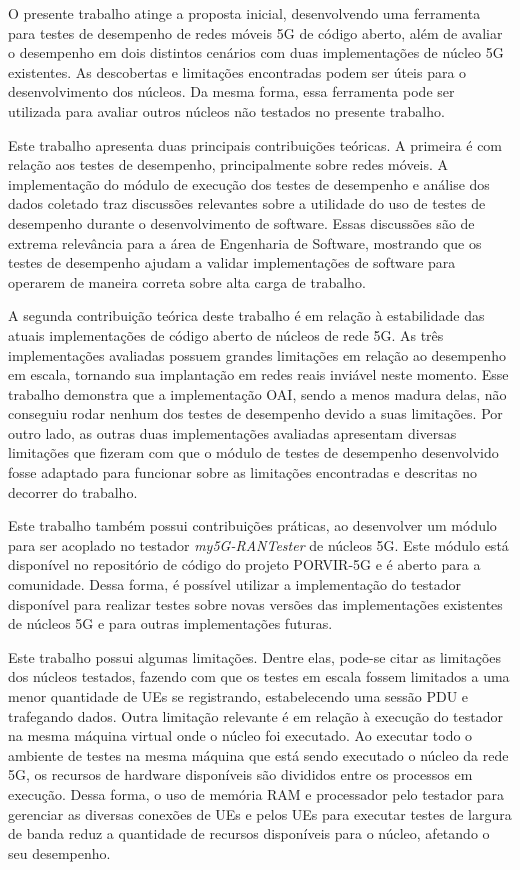 O presente trabalho atinge a proposta inicial, desenvolvendo uma ferramenta para testes de desempenho de redes móveis 5G de código aberto, além de avaliar o desempenho em dois distintos cenários com duas implementações de núcleo 5G existentes.
As descobertas e limitações encontradas podem ser úteis para o desenvolvimento dos núcleos. Da mesma forma, essa ferramenta pode ser utilizada para avaliar outros núcleos não testados no presente trabalho.

Este trabalho apresenta duas principais contribuições teóricas. A primeira é com relação aos testes de desempenho, principalmente sobre redes móveis.
A implementação do módulo de execução dos testes de desempenho e análise dos dados coletado traz discussões relevantes sobre a utilidade do uso de testes de desempenho durante o desenvolvimento de software.
Essas discussões são de extrema relevância para a área de Engenharia de Software, mostrando que os testes de desempenho ajudam a validar implementações de software para operarem de maneira correta sobre alta carga de trabalho.

A segunda contribuição teórica deste trabalho é em relação à estabilidade das atuais implementações de código aberto de núcleos de rede 5G.
As três implementações avaliadas possuem grandes limitações em relação ao desempenho em escala, tornando sua implantação em redes reais inviável neste momento.
Esse trabalho demonstra que a implementação OAI, sendo a menos madura delas, não conseguiu rodar nenhum dos testes de desempenho devido a suas limitações.
Por outro lado, as outras duas implementações avaliadas apresentam diversas limitações que fizeram com que o módulo de testes de desempenho desenvolvido fosse adaptado para funcionar sobre as limitações encontradas e descritas no decorrer do trabalho.

Este trabalho também possui contribuições práticas, ao desenvolver um módulo para ser acoplado no testador \textit{my5G-RANTester} de núcleos 5G.
Este módulo está disponível no repositório de código do projeto PORVIR-5G e é aberto para a comunidade.
Dessa forma, é possível utilizar a implementação do testador disponível para realizar testes sobre novas versões das implementações existentes de núcleos 5G e para outras implementações futuras.

Este trabalho possui algumas limitações.
Dentre elas, pode-se citar as limitações dos núcleos testados, fazendo com que os testes em escala fossem limitados a uma menor quantidade de UEs se registrando, estabelecendo uma sessão PDU e trafegando dados.
Outra limitação relevante é em relação à execução do testador na mesma máquina virtual onde o núcleo foi executado.
Ao executar todo o ambiente de testes na mesma máquina que está sendo executado o núcleo da rede 5G, os recursos de hardware disponíveis são divididos entre os processos em execução.
Dessa forma, o uso de memória RAM e processador pelo testador para gerenciar as diversas conexões de UEs e pelos UEs para executar testes de largura de banda reduz a quantidade de recursos disponíveis para o núcleo, afetando o seu desempenho.

